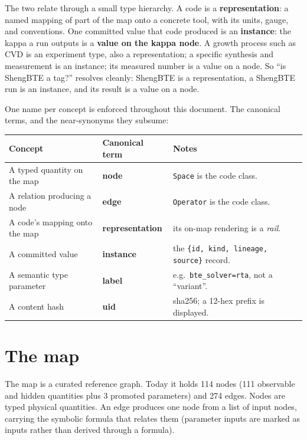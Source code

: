 \documentclass[11pt,a4paper]{article}
\begin{document}
The two relate through a small type hierarchy. A code is a \textbf{representation}: a
named mapping of part of the map onto a concrete tool, with its units, gauge,
and conventions. One committed value that code produced is an \textbf{instance}:
the kappa a run outputs is a \textbf{value on the kappa node}. A growth process such as CVD is an
experiment type, also a representation; a specific synthesis and measurement is
an instance; its measured number is a value on a node. So ``is ShengBTE a tag?''
resolves cleanly: ShengBTE is a representation, a ShengBTE run is an instance,
and its result is a value on a node.

One name per concept is enforced throughout this document. The canonical terms,
and the near-synonyms they subsume:

\begin{center}
\small
\begin{tabular}{lll}
\toprule
Concept & Canonical term & Notes \\
\midrule
A typed quantity on the map    & \textbf{node} & \texttt{Space} is the code class. \\
A relation producing a node    & \textbf{edge} & \texttt{Operator} is the code class. \\
A code's mapping onto the map  & \textbf{representation} & its on-map rendering is a \emph{rail}. \\
A committed value               & \textbf{instance} & the \texttt{\{id, kind, lineage, source\}} record. \\
A semantic type parameter       & \textbf{label} & e.g.\ \texttt{bte\_solver=rta}, not a ``variant''. \\
A content hash                  & \textbf{uid} & sha256; a 12-hex prefix is displayed. \\
\bottomrule
\end{tabular}
\end{center}

\section{The map}

The map is a curated reference graph. Today it holds 114 nodes (111 observable
and hidden quantities plus 3 promoted parameters) and 274 edges. Nodes are
typed physical quantities. An edge produces one node from a list of input
nodes, carrying the symbolic formula that relates them (parameter inputs are
marked as inputs rather than derived through a formula).
\end{document}
